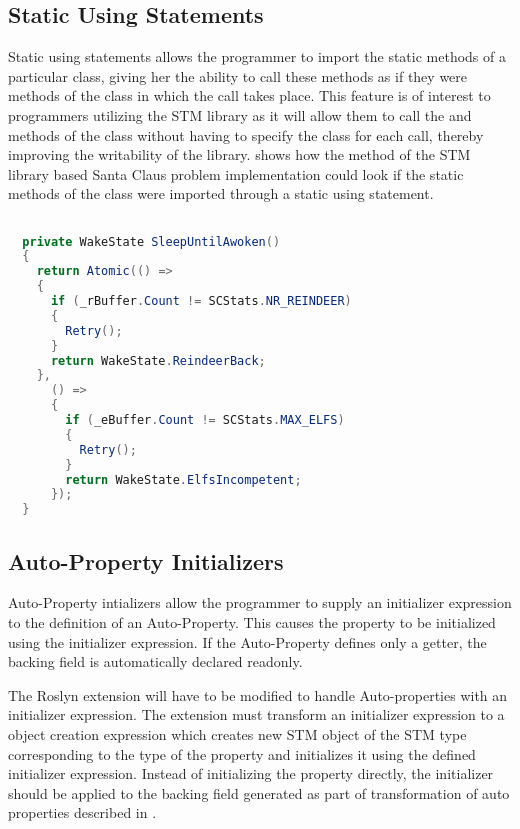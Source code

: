 \subsection{Static Using Statements}
Static using statements allows the programmer to import the static methods of a particular class, giving her the ability to call these methods as if they were methods of the class in which the call takes place\cite{csharp6one}\cite{csharp6featureDescription}. This feature is of interest to programmers utilizing the \ac{STM} library as it will allow them to call the  and  methods of the  class without having to specify the class for each call, thereby improving the writability of the library.  shows how the  method of the \ac{STM} library based Santa Claus problem implementation could look if the static methods of the  class were imported through a static using statement.

\begin{lstlisting}[float,label=lst:static_using_example,
  caption={\ac{STM} library with static using statement},
  language=Java,  
  showspaces=false,
  showtabs=false,
  breaklines=true,
  showstringspaces=false,
  breakatwhitespace=true,
  escapechar=~,
  commentstyle=\color{greencomments},
  keywordstyle=\color{bluekeywords},
  stringstyle=\color{redstrings},
  morekeywords={atomic, retry, orelse, var, get, set, ref, out}]  % Start your code-block

  private WakeState SleepUntilAwoken()
  {
    return Atomic(() =>
    {
      if (_rBuffer.Count != SCStats.NR_REINDEER)
      {
        Retry();
      }
      return WakeState.ReindeerBack;
    },
      () =>
      {
        if (_eBuffer.Count != SCStats.MAX_ELFS)
        {
          Retry();
        }
        return WakeState.ElfsIncompetent;
      });
  }
\end{lstlisting}

\subsection{Auto-Property Initializers}
Auto-Property intializers allow the programmer to supply an initializer expression to the definition of an Auto-Property\cite{csharp6one}\cite{csharp6two}\cite{csharp6featureDescription}. This causes the property  to be initialized using the initializer expression. If the Auto-Property defines only a getter, the backing field is automatically declared readonly\cite{csharp6one}\cite{csharp6featureDescription}. 

The Roslyn extension will have to be modified to handle  Auto-properties with an initializer expression. The extension must transform an initializer expression to a object creation expression which creates new \ac{STM} object of the \ac{STM} type corresponding to the type of the  property and initializes it using the defined initializer expression. Instead of initializing the property directly, the initializer should be applied to the backing field generated as part of transformation of  auto properties described in .

\worksheetend
